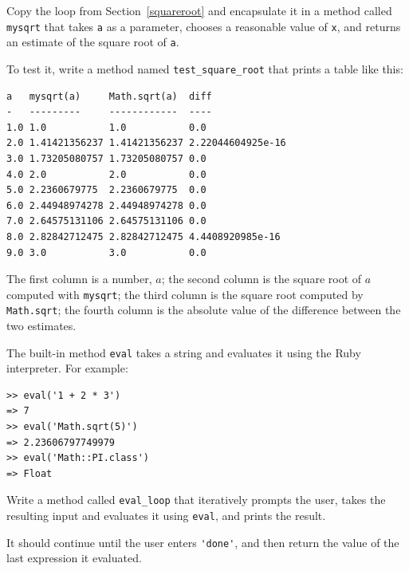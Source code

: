 \documentclass[10pt]{book}
\begin{document}
\begin{exercise}

Copy the loop from Section~\ref{squareroot}
and encapsulate it in a method called
\verb"mysqrt" that takes {\tt a} as a parameter, chooses a
reasonable value of {\tt x}, and returns an estimate of the square
root of {\tt a}.  

To test it, write a method named \verb"test_square_root"
that prints a table like this:

\begin{verbatim}
a   mysqrt(a)     Math.sqrt(a)  diff
-   ---------     ------------  ----
1.0 1.0           1.0           0.0
2.0 1.41421356237 1.41421356237 2.22044604925e-16
3.0 1.73205080757 1.73205080757 0.0
4.0 2.0           2.0           0.0
5.0 2.2360679775  2.2360679775  0.0
6.0 2.44948974278 2.44948974278 0.0
7.0 2.64575131106 2.64575131106 0.0
8.0 2.82842712475 2.82842712475 4.4408920985e-16
9.0 3.0           3.0           0.0
\end{verbatim}
%
The first column is a number, $a$; the second column is the square
root of $a$ computed with \verb"mysqrt"; the third column is the
square root computed by {\tt Math.sqrt}; the fourth column is the
absolute value of the difference between the two estimates.
\end{exercise}


\begin{exercise}

The built-in method {\tt eval} takes a string and evaluates
it using the Ruby interpreter.  For example:

\begin{verbatim}
>> eval('1 + 2 * 3')
=> 7
>> eval('Math.sqrt(5)')
=> 2.23606797749979
>> eval('Math::PI.class')
=> Float
\end{verbatim}
%
Write a method called \verb"eval_loop" that iteratively
prompts the user, takes the resulting input and evaluates
it using {\tt eval}, and prints the result.

It should continue until the user enters \verb"'done'", and then
return the value of the last expression it evaluated.

\end{exercise}
\end{document}
